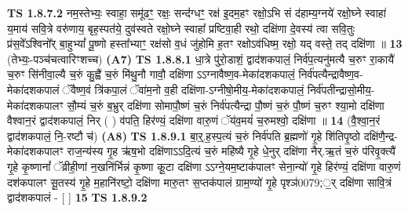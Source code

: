 \documentclass[17pt]{extarticle}
\begin{document}
                  \newline
                                \textbf{ TS 1.8.7.2} \newline
                  नम॒स्तेभ्यः॒ स्वाहा॒ समू॑ढꣳ॒॒ रक्षः॒ सन्द॑॑ग्धꣳ॒॒ रक्ष॑ इ॒दम॒हꣳ रक्षो॒ऽभि सं द॑हाम्य॒ग्नये॑ रक्षो॒घ्ने स्वाहा॑ य॒माय॑ सवि॒त्रे वरु॑णाय॒ बृह॒स्पत॑ये॒ दुव॑स्वते रक्षो॒घ्ने स्वाहा᳚ प्रष्टिवा॒ही रथो॒ दक्षि॑णा दे॒वस्य॑ त्वा सवि॒तुः प्र॑स॒वे᳚ऽश्विनो᳚र् बा॒हुभ्यां᳚ पू॒ष्णो हस्ता᳚भ्याꣳ॒॒ रक्ष॑सो व॒धं जु॑होमि ह॒तꣳ रक्षोऽव॑धिष्म॒ रक्षो॒ यद् वस्ते॒ तद् दक्षि॑णा ॥ \textbf{  13 } \newline
                  \newline
                      (तेभ्यः॒-पञ्च॑चत्वारिꣳशच्च)  \textbf{(A7)} \newline \newline
                                        \textbf{ TS 1.8.8.1} \newline
                  धा॒त्रे पु॑रो॒डाशं॒ द्वाद॑शकपालं॒ निर्व॑प॒त्यनु॑मत्यै च॒रुꣳ रा॒कायै॑ च॒रुꣳ सि॑नीवा॒ल्यै च॒रुं कु॒ह्वै॑ च॒रुं मि॑थु॒नौ गावौ॒ दक्षि॑णा ऽऽग्नावैष्ण॒व-मेका॑दशकपालं॒ निर्व॑पत्यैन्द्रावैष्ण॒व-मेका॑दशकपालं ॅवैष्ण॒वं त्रि॑कपा॒लं ॅवा॑म॒नो व॒ही दक्षि॑णा-ऽग्नीषो॒मीय॒-मेका॑दशकपालं॒ निर्व॑पतीन्द्रासो॒मीय॒- मेका॑दशकपालꣳ सौ॒म्यं च॒रुं ब॒भ्रुर् दक्षि॑णा सोमापौ॒ष्णं च॒रुं निर्व॑पत्यैन्द्रा पौ॒ष्णं च॒रुं पौ॒ष्णं च॒रुꣳ श्या॒मो दक्षि॑णा वैश्वान॒रं द्वाद॑शकपालं॒ निर् ( ) व॑पति॒ हिर॑ण्यं॒ दक्षि॑णा वारु॒णं ॅय॑व॒मयं॑ च॒रुमश्वो॒ दक्षि॑णा ॥ \textbf{  14} \newline
                  \newline
                      (वै॒श्वा॒न॒रं द्वाद॑शकपालं॒ नि॒-रष्टौ च॑)  \textbf{(A8)} \newline \newline
                                        \textbf{ TS 1.8.9.1} \newline
                  बा॒र्॒.ह॒स्प॒त्यं च॒रुं निर्व॑पति ब्र॒ह्मणो॑ गृ॒हे शि॑तिपृ॒ष्ठो दक्षि॑णै॒न्द्र-मेका॑दशकपालꣳ राज॒न्य॑स्य गृ॒ह ऋ॑ष॒भो दक्षि॑णाऽऽदि॒त्यं च॒रुं महि॑ष्यै गृ॒हे धे॒नुर् दक्षि॑णा नैर्.ऋ॒तं च॒रुं प॑रिवृ॒क्त्यै॑ गृ॒हे कृ॒ष्णानां᳚ ॅव्रीही॒णां न॒खनि॑र्भिन्नं कृ॒ष्णा कू॒टा दक्षि॑णा ऽऽग्ने॒यम॒ष्टाक॑पालꣳ सेना॒न्यो॑ गृ॒हे हिर॑ण्यं॒ दक्षि॑णा वारु॒णं दश॑कपालꣳ सू॒तस्य॑ गृ॒हे म॒हानि॑रष्टो॒ दक्षि॑णा मारु॒तꣳ स॒प्तक॑पालं ग्राम॒ण्यो॑ गृ॒हे पृश्ञ॑0079;॒र् दक्षि॑णा सावि॒त्रं द्वाद॑शकपालं - [ ] \textbf{  15} \newline
                  \newline
                                \textbf{ TS 1.8.9.2} \newline
\end{document}
